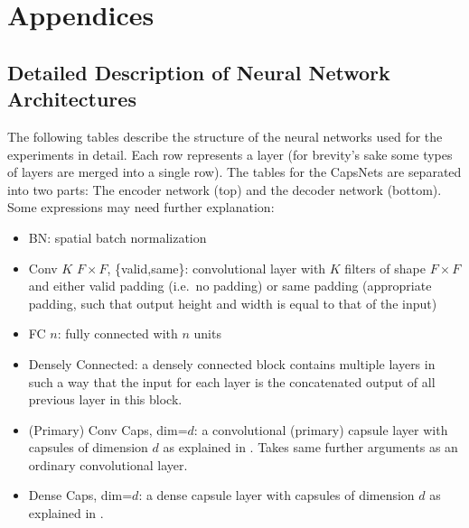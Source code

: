 \appendix
\section*{Appendices}
\renewcommand{\thesubsection}{\Alph{subsection}}

\subsection{Detailed Description of Neural Network Architectures}
\label{lab:networks}

The following tables describe the structure of the neural networks used for the experiments in detail. Each row represents a layer (for brevity's sake some types of layers are merged into a single row).
The tables for the CapsNets are separated into two parts: The encoder network (top) and the decoder network (bottom).
Some expressions may need further explanation:

\begin{itemize}
	\item BN: spatial batch normalization
	\item Conv $K$ $F \times F$, \{valid,same\}: convolutional layer with $K$ filters of shape $F \times F$ and either valid padding (i.e.\ no padding) or same padding (appropriate padding, such that output height and width is equal to that of the input)
	\item FC $n$: fully connected with $n$ units
	\item Densely Connected: a densely connected block \citep{denselyconnected} contains multiple layers in such a way that the input for each layer is the concatenated output of all previous layer in this block.
	\item (Primary) Conv Caps, dim=$d$: a convolutional (primary) capsule layer with capsules of dimension $d$ as explained in . Takes same further arguments as an ordinary convolutional layer.
	\item Dense Caps, dim=$d$: a dense capsule layer with capsules of dimension $d$ as explained in .
\end{itemize}

